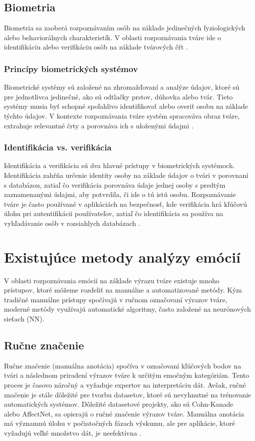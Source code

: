 \subsection{Biometria}
Biometria sa zaoberá rozpoznávaním osôb na základe jedinečných fyziologických alebo behaviorálnych charakteristík. V oblasti rozpoznávania tváre ide o identifikáciu alebo verifikáciu osôb 
na základe tvárových čŕt​ \cite{inProceedings01} \cite{article03}.
\subsubsection{Princípy biometrických systémov}
Biometrické systémy sú založené na zhromažďovaní a analýze údajov, ktoré sú pre jednotlivca jedinečné, ako sú odtlačky prstov, dúhovka alebo tvár. Tieto systémy musia byť schopné spoľahlivo identifikovať 
alebo overiť osobu na základe týchto údajov. V kontexte rozpoznávania tváre systém spracováva obraz tváre, extrahuje relevantné črty a porovnáva ich s uloženými údajmi​ \cite{article01}.
\subsubsection{Identifikácia vs. verifikácia}
Identifikácia a verifikácia sú dva hlavné prístupy v biometrických systémoch. Identifikácia zahŕňa určenie identity osoby na základe údajov o tvári v porovnaní s databázou, zatiaľ čo verifikácia porovnáva 
údaje jednej osoby s predtým zaznamenanými údajmi, aby potvrdila, či ide o tú istú osobu​\cite{inProceedings01}. Rozpoznávanie tváre je často používané v aplikáciách na bezpečnosť, kde verifikácia 
hrá kľúčovú úlohu pri autentifikácii používateľov, zatiaľ čo identifikácia sa používa na vyhľadávanie osôb v rozsiahlych databázach \cite{article03}.

\section{Existujúce metody analýzy emócií}
V oblasti rozpoznávania emócií na základe výrazu tváre existuje mnoho prístupov, ktoré môžeme rozdeliť na manuálne a automatizované metódy. Kým tradičné manuálne prístupy spočívajú v ručnom označovaní 
výrazov tváre, moderné metódy využívajú automatické algoritmy, často založené na neurónových sieťach (NN).

\subsection{Ručne značenie}
Ručne značenie (manuálna anotácia) spočíva v označovaní kľúčových bodov na tvári a následnom priradení výrazov tváre k určitým emočným kategóriám. Tento proces je časovo náročný a vyžaduje expertov 
na interpretáciu dát. Avšak, ručné značenie je stále dôležité pre tvorbu datasetov, ktoré sú nevyhnutné na trénovanie automatických systémov. Dôležité datasetové projekty, ako sú Cohn-Kanade alebo AffectNet, 
sa opierajú o ručné značenie výrazov tváre​. Manuálna anotácia má významnú úlohu v počiatočných fázach výskumu, ale pre aplikácie, ktoré vyžadujú veľké množstvo dát, je neefektívna \cite{article01}.

